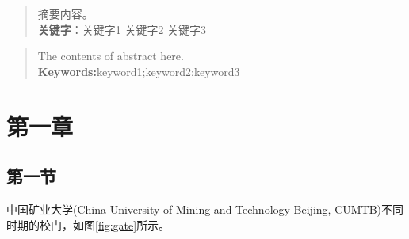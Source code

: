 \documentclass[UTF8,AutoFakeBold=1.3,fixskip = true]{ctexart}
\numberwithin{figure}{section}
\numberwithin{table}{section}
\numberwithin{equation}{section}
\begin{document}
\fontsize{12.0pt}{\baselineskip}\selectfont
\setlength{\baselineskip}{25pt}%
\setlength{\parskip}{0pt}%


\begin{spacing}{1.5}
\renewcommand{\abstractname}{\zihao{3} 摘\quad\quad 要}
\begin{abstract}
 	\pagestyle{plain}
 	\thispagestyle{empty}%
	\hspace*{\fill} 
	\par 摘要内容。
	\\[2em]
	\textbf{关键字}：\quad 关键字1 \quad 关键字2 \quad 关键字3
\end{abstract}

\newpage
{}
\begin{abstract}
	\pagestyle{plain}
	\thispagestyle{empty}
	\vspace{1em}
	\par The contents of abstract here.
	\\[2em]
	\textbf{Keywords:}\quad keyword1;\quad keyword2;\quad keyword3

\end{abstract}

\end{spacing}

\newpage
\tableofcontents\thispagestyle{empty}


\newpage
\setcounter{page}{1}%

\section{第一章}

	\subsection{第一节}	
		中国矿业大学(China University of Mining and Technology Beijing, CUMTB)\cite{cumtb1909}不同时期的校门，如图\ref{fig:gate}所示。
\end{document}
